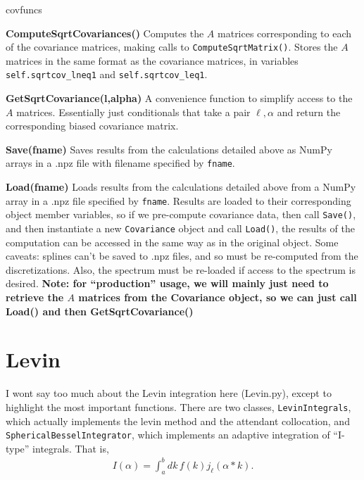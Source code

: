 \documentclass[10pt,a4paper]{article}
\begin{document}
\begin{labeling}{covfuncs}
	\item[\textbf{ComputeSqrtCovariances()}] Computes the $A$ matrices corresponding to each of the covariance matrices, making calls to \verb|ComputeSqrtMatrix()|. Stores the $A$ matrices in the same format as the covariance matrices, in variables \verb|self.sqrtcov_lneq1| and \verb|self.sqrtcov_leq1|.
	
	\item[\textbf{GetSqrtCovariance(l,alpha)}] A convenience function to simplify access to the $A$ matrices. Essentially just conditionals that take a pair $\ell,\alpha$ and return the corresponding biased covariance matrix.
	
	\item[\textbf{Save(fname)}] Saves results from the calculations detailed above as NumPy arrays in a .npz file with filename specified by \verb|fname|.
	
	\item[\textbf{Load(fname)}] Loads results from the calculations detailed above from a NumPy array in a .npz file specified by \verb|fname|. Results are loaded to their corresponding object member variables, so if we pre-compute covariance data, then call \verb|Save()|, and then instantiate a new \verb|Covariance| object and call \verb|Load()|, the results of the computation can be accessed in the same way as in the original object. Some caveats: splines can't be saved to .npz files, and so must be re-computed from the discretizations. Also, the spectrum must be re-loaded if access to the spectrum is desired.
	\textbf{Note: for ``production'' usage, we will mainly just need to retrieve the $A$ matrices from the Covariance object, so we can just call Load() and then GetSqrtCovariance()}
\end{labeling}

\section{Levin}
I wont say too much about the Levin integration here (Levin.py), except to highlight the most important functions. There are two classes, \verb|LevinIntegrals|, which actually implements the levin method and the attendant collocation, and \verb|SphericalBesselIntegrator|, which implements an adaptive integration of ``I-type'' integrals. That is,
\begin{align} \label{eq:iint}
	I(\alpha) = \int_{a}^{b}dk\, f(k)j_\ell(\alpha*k).
\end{align}
\end{document}
